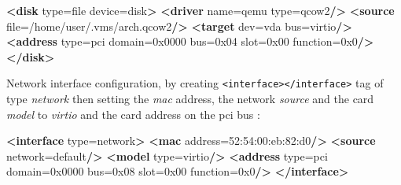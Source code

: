 \documentclass[
  14pt,
  english,
  a4paper,
]{scrreprt}
\newenvironment{Shaded}{}{}
\newcommand{\KeywordTok}[1]{\textcolor[rgb]{0.00,0.44,0.13}{\textbf{#1}}}
\newcommand{\OtherTok}[1]{\textcolor[rgb]{0.00,0.44,0.13}{#1}}
\newcommand{\StringTok}[1]{\textcolor[rgb]{0.25,0.44,0.63}{#1}}
\begin{document}
\begin{Shaded}
\begin{Highlighting}[]
   \KeywordTok{\textless{}disk}\OtherTok{ type=}\StringTok{\textquotesingle{}file\textquotesingle{}}\OtherTok{ device=}\StringTok{\textquotesingle{}disk\textquotesingle{}}\KeywordTok{\textgreater{}}
     \KeywordTok{\textless{}driver}\OtherTok{ name=}\StringTok{\textquotesingle{}qemu\textquotesingle{}}\OtherTok{ type=}\StringTok{\textquotesingle{}qcow2\textquotesingle{}}\KeywordTok{/\textgreater{}}
     \KeywordTok{\textless{}source}\OtherTok{ file=}\StringTok{\textquotesingle{}/home/user/.vms/arch.qcow2\textquotesingle{}}\KeywordTok{/\textgreater{}}
     \KeywordTok{\textless{}target}\OtherTok{ dev=}\StringTok{\textquotesingle{}vda\textquotesingle{}}\OtherTok{ bus=}\StringTok{\textquotesingle{}virtio\textquotesingle{}}\KeywordTok{/\textgreater{}}
     \KeywordTok{\textless{}address}\OtherTok{ type=}\StringTok{\textquotesingle{}pci\textquotesingle{}}\OtherTok{ domain=}\StringTok{\textquotesingle{}0x0000\textquotesingle{}}\OtherTok{ bus=}\StringTok{\textquotesingle{}0x04\textquotesingle{}}\OtherTok{ slot=}\StringTok{\textquotesingle{}0x00\textquotesingle{}}\OtherTok{ function=}\StringTok{\textquotesingle{}0x0\textquotesingle{}}\KeywordTok{/\textgreater{}}
   \KeywordTok{\textless{}/disk\textgreater{}}
\end{Highlighting}
\end{Shaded}

Network interface configuration, by creating
\texttt{\textless{}interface\textgreater{}\textless{}/interface\textgreater{}}
tag of type \emph{network} then setting the \emph{mac} address, the
network \emph{source} and the card \emph{model} to \emph{virtio} and the
card address on the pci bus :

\begin{Shaded}
\begin{Highlighting}[]
   \KeywordTok{\textless{}interface}\OtherTok{ type=}\StringTok{\textquotesingle{}network\textquotesingle{}}\KeywordTok{\textgreater{}}
     \KeywordTok{\textless{}mac}\OtherTok{ address=}\StringTok{\textquotesingle{}52:54:00:eb:82:d0\textquotesingle{}}\KeywordTok{/\textgreater{}}
     \KeywordTok{\textless{}source}\OtherTok{ network=}\StringTok{\textquotesingle{}default\textquotesingle{}}\KeywordTok{/\textgreater{}}
     \KeywordTok{\textless{}model}\OtherTok{ type=}\StringTok{\textquotesingle{}virtio\textquotesingle{}}\KeywordTok{/\textgreater{}}
     \KeywordTok{\textless{}address}\OtherTok{ type=}\StringTok{\textquotesingle{}pci\textquotesingle{}}\OtherTok{ domain=}\StringTok{\textquotesingle{}0x0000\textquotesingle{}}\OtherTok{ bus=}\StringTok{\textquotesingle{}0x08\textquotesingle{}}\OtherTok{ slot=}\StringTok{\textquotesingle{}0x00\textquotesingle{}}\OtherTok{ function=}\StringTok{\textquotesingle{}0x0\textquotesingle{}}\KeywordTok{/\textgreater{}}
   \KeywordTok{\textless{}/interface\textgreater{}}
\end{Highlighting}
\end{Shaded}
\end{document}
